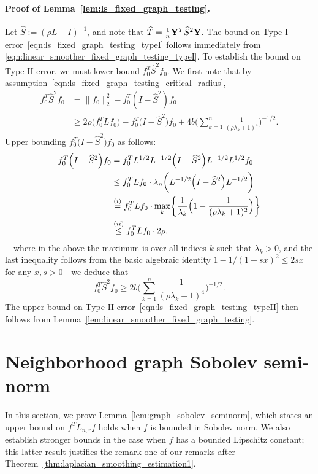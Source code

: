 \documentclass[twoside]{article}
\newcommand{\1}{\mathbf{1}}
\newcommand{\Lap}{L}
\newcommand{\Id}{I}
\newcommand{\wh}[1]{\widehat{#1}}
\theoremstyle{definition}
\theoremstyle{remark}
\begin{document}
\paragraph{Proof of Lemma~\ref{lem:ls_fixed_graph_testing}.}
Let $\wh{S} := (\rho \Lap + \Id)^{-1}$, and note that $\wh{T} = \frac{1}{n}{\bf Y}^T \wh{S}^2 {\bf Y}$. The bound on Type I error~\eqref{eqn:ls_fixed_graph_testing_typeI} follows immediately from \eqref{eqn:linear_smoother_fixed_graph_testing_typeI}. 
To establish the bound on Type II error, we must lower bound $f_0^T \wh{S}^2 f_0$. We first note that by assumption~\eqref{eqn:ls_fixed_graph_testing_critical_radius},
\begin{align*}
f_0^{T} \wh{S}^2 f_0 & = \bigl\|f_0\bigr\|_2^2 - f_0^T(I - \wh{S}^2)f_0 \\
& \geq 2 \rho \bigl(f_0^T \Lap f_0\bigr) - f_0^T\bigl(I - \wh{S}^2\bigr)f_0 + 4b \Biggl(\sum_{k = 1}^{n} \frac{1}{(\rho\lambda_k + 1)^4} \Biggr)^{-1/2}.
\end{align*}
Upper bounding $f_0^T\bigl(I - \wh{S}^2\bigr)f_0$ as follows:
\begin{equation*}
\begin{aligned}
f_0^T \Bigl(\Id - \wh{S}^2\Bigr) f_0  & = f_0^T \Lap^{1/2} \Lap^{-1/2}\Bigl(\Id - \wh{S}^2\Bigr) \Lap^{-1/2} \Lap^{1/2} f_0 \\ 
& \leq f_0^T \Lap f_0 \cdot  \lambda_{n}\biggl(\Lap^{-1/2}\Bigl(\Id - \wh{S}^2\Bigr) \Lap^{-1/2}\biggr) \\ 
& \overset{(i)}{=}  f_0^T \Lap f_0 \cdot \max_{k} \biggl\{ \frac{1}{\lambda_k} \Bigl(1 - \frac{1}{(\rho \lambda_k + 1)^2}\Bigr) \biggr\} \\
& \overset{(ii)}{\leq} f_0^T \Lap f_0 \cdot 2\rho,
\end{aligned}
\end{equation*}
---where in the above the maximum is over all indices $k$ such that $\lambda_k > 0$, and the last inequality follows from the basic algebraic identity $1 - 1/(1 + s x)^2 \leq 2 s x$ for any $x, s > 0$---we deduce that
\begin{equation*}
f_0^{T} \wh{S}^2 f_0 \geq 2b \biggl(\sum_{k = 1}^{n} \frac{1}{(\rho\lambda_k + 1)^4} \biggr)^{-1/2}.
\end{equation*} 
The upper bound on Type II error~\eqref{eqn:ls_fixed_graph_testing_typeII} then follows from Lemma~\ref{lem:linear_smoother_fixed_graph_testing}.

\section{Neighborhood graph Sobolev semi-norm}
\label{sec:graph_sobolev_seminorm}
In this section, we prove Lemma~\ref{lem:graph_sobolev_seminorm}, which states an upper bound on $f^T \Lap_{n,r} f$ holds when $f$ is bounded in Sobolev norm. We also establish stronger bounds in the case when $f$ has a bounded Lipschitz constant; this latter result justifies the remark one of our remarks after Theorem~\ref{thm:laplacian_smoothing_estimation1}. 
\end{document}
